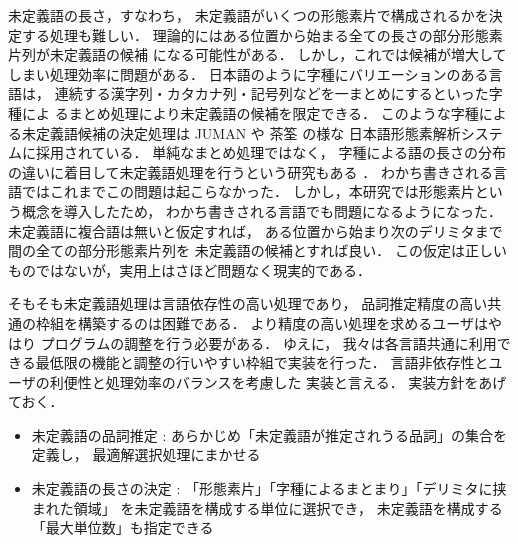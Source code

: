 未定義語の長さ，すなわち，
未定義語がいくつの形態素片で構成されるかを決定する処理も難しい．
理論的にはある位置から始まる全ての長さの部分形態素片列が未定義語の候補
になる可能性がある．
しかし，これでは候補が増大してしまい処理効率に問題がある．
日本語のように字種にバリエーションのある言語は，
連続する漢字列・カタカナ列・記号列などを一まとめにするといった字種によ
るまとめ処理により未定義語の候補を限定できる\cite{長尾96}．
このような字種による未定義語候補の決定処理は
JUMAN\cite{JUMAN98} や 茶筌\cite{ChaSen99} の様な
日本語形態素解析システムに採用されている．
単純なまとめ処理ではなく，
字種による語の長さの分布の違いに着目して未定義語処理を行うという研究もある
\cite{Nagata99}．
わかち書きされる言語ではこれまでこの問題は起こらなかった．
しかし，本研究では形態素片という概念を導入したため，
わかち書きされる言語でも問題になるようになった．
未定義語に複合語は無いと仮定すれば，
ある位置から始まり次のデリミタまで間の全ての部分形態素片列を
未定義語の候補とすれば良い．
この仮定は正しいものではないが，実用上はさほど問題なく現実的である．

そもそも未定義語処理は言語依存性の高い処理であり，
品詞推定精度の高い共通の枠組を構築するのは困難である．
より精度の高い処理を求めるユーザはやはり
プログラムの調整を行う必要がある．
ゆえに，
我々は各言語共通に利用できる最低限の機能と調整の行いやすい枠組で実装を行った．
言語非依存性とユーザの利便性と処理効率のバランスを考慮した
実装と言える．
実装方針をあげておく．

\begin{itemize}
\item 未定義語の品詞推定 : 
  あらかじめ「未定義語が推定されうる品詞」の集合を定義し，
  最適解選択処理にまかせる

\item 未定義語の長さの決定 : 
  「形態素片」「字種によるまとまり」「デリミタに挟まれた領域」
  を未定義語を構成する単位に選択でき，
  未定義語を構成する「最大単位数」も指定できる
\end{itemize}



